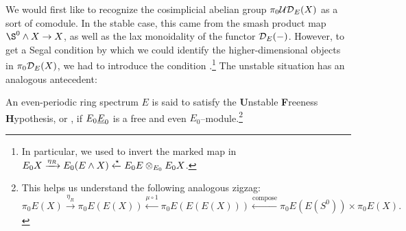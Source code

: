 We would first like to recognize the cosimplicial abelian group \(\pi_0 \mathcal{UD}_E(X)\) as a sort of comodule.  In the stable case, this came from the smash product map \(\S^0 \sm X \to X\), as well as the lax monoidality of the functor \(\mathcal{D}_E(-)\).  However, to get a Segal condition by which we could identify the higher-dimensional objects in \(\pi_0 \mathcal{D}_E(X)\), we had to introduce the condition .\footnote{In particular, we used {\FH} to invert the marked map in \(E_0 X \xrightarrow{\eta_R} E_0(E \wedge X) \xleftarrow{\star} E_0 E \otimes_{E_0} E_0 X\).}  The unstable situation has an analogous antecedent:

\begin{definition}
An even-periodic ring spectrum \(E\) is said to satisfy the \textbf{U}nstable \textbf{F}reeness \textbf{H}ypothesis, or \UFH, if \(E_0 \OS{E}{0}\) is a free and even \(E_0\)--module.\footnote{This helps us understand the following analogous zigzag: \[\pi_0 E(X) \xrightarrow{\eta_R} \pi_0 E(E(X)) \xleftarrow{\mu \circ 1} \pi_0 E(E(E(X))) \xleftarrow{\mathrm{compose}} \pi_0 E(E(S^0)) \times \pi_0 E(X).\]}
\end{definition}

